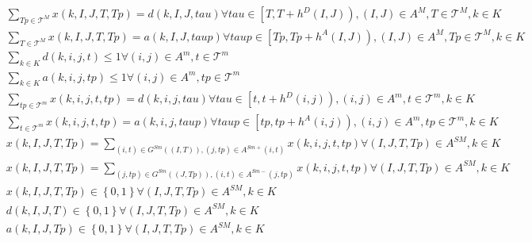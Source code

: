 \begin{align}
  & \sum_{Tp \in \mathcal{T}^{M}} x \left(k , I , J , T , Tp\right) = d \left(k , I , J , \mathit{tau}\right) \forall \mathit{tau} \in \left[T , T + h^{D} \left(I , J\right)\right) , \left(I , J\right) \in A^{M} , T \in \mathcal{T}^{M} , k \in K \tag{eq\_0010} \\
  & \sum_{T \in \mathcal{T}^{M}} x \left(k , I , J , T , Tp\right) = a \left(k , I , J , taup\right) \forall taup \in \left[Tp , Tp + h^{A} \left(I , J\right)\right) , \left(I , J\right) \in A^{M} , Tp \in \mathcal{T}^{M} , k \in K \tag{eq\_0011} \\
  & \sum_{k \in K} d \left(k , i , j , t\right) \leq 1 \forall \left(i , j\right) \in A^{m} , t \in \mathcal{T}^{m} \tag{eq\_0012} \\
  & \sum_{k \in K} a \left(k , i , j , tp\right) \leq 1 \forall \left(i , j\right) \in A^{m} , tp \in \mathcal{T}^{m} \tag{eq\_0013} \\
  & \sum_{tp \in \mathcal{T}^{m}} x \left(k , i , j , t , tp\right) = d \left(k , i , j , \mathit{tau}\right) \forall \mathit{tau} \in \left[t , t + h^{D} \left(i , j\right)\right) , \left(i , j\right) \in A^{m} , t \in \mathcal{T}^{m} , k \in K \tag{eq\_0014} \\
  & \sum_{t \in \mathcal{T}^{m}} x \left(k , i , j , t , tp\right) = a \left(k , i , j , taup\right) \forall taup \in \left[tp , tp + h^{A} \left(i , j\right)\right) , \left(i , j\right) \in A^{m} , tp \in \mathcal{T}^{m} , k \in K \tag{eq\_0015} \\
  & x \left(k , I , J , T , Tp\right) = \sum_{\left(i , t\right) \in G^{S m} \left(\left(I , T\right)\right), \left(j , tp\right) \in A^{S m +} \left(i , t\right)} x \left(k , i , j , t , tp\right) \forall \left(I , J , T , Tp\right) \in A^{S M} , k \in K \tag{eq\_0016} \\
  & x \left(k , I , J , T , Tp\right) = \sum_{\left(j , tp\right) \in G^{S m} \left(\left(J , Tp\right)\right), \left(i , t\right) \in A^{S m -} \left(j , tp\right)} x \left(k , i , j , t , tp\right) \forall \left(I , J , T , Tp\right) \in A^{S M} , k \in K \tag{eq\_0017} \\
  & x \left(k , I , J , T , Tp\right) \in \left\{0 , 1\right\} \forall \left(I , J , T , Tp\right) \in A^{S M} , k \in K \tag{eq\_0018} \\
  & d \left(k , I , J , T\right) \in \left\{0 , 1\right\} \forall \left(I , J , T , Tp\right) \in A^{S M} , k \in K \tag{eq\_0019} \\
  & a \left(k , I , J , Tp\right) \in \left\{0 , 1\right\} \forall \left(I , J , T , Tp\right) \in A^{S M} , k \in K \tag{eq\_0020} \\

\end{align}
